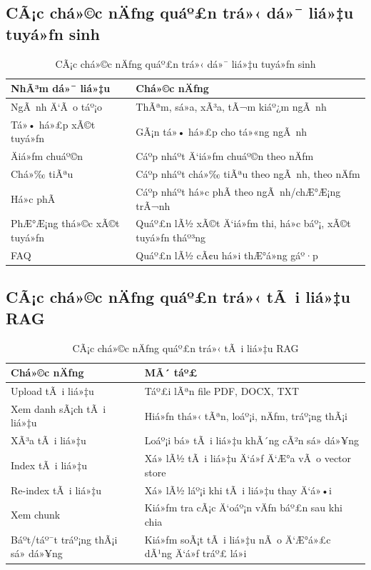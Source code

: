 ﻿\documentclass[12pt,a4paper]{report}
\begin{document}
\subsection{CÃ¡c chá»©c nÄƒng quáº£n trá»‹ dá»¯ liá»‡u tuyá»ƒn sinh}
\begin{table}[H]
\centering
\caption{CÃ¡c chá»©c nÄƒng quáº£n trá»‹ dá»¯ liá»‡u tuyá»ƒn sinh}
\label{tab:admin_data_functions}
\begin{tabular}{|p{4cm}|p{8cm}|}
\hline
\textbf{NhÃ³m dá»¯ liá»‡u} & \textbf{Chá»©c nÄƒng} \\ \hline
NgÃ nh Ä‘Ã o táº¡o & ThÃªm, sá»­a, xÃ³a, tÃ¬m kiáº¿m ngÃ nh \\ \hline
Tá»• há»£p xÃ©t tuyá»ƒn & GÃ¡n tá»• há»£p cho tá»«ng ngÃ nh \\ \hline
Äiá»ƒm chuáº©n & Cáº­p nháº­t Ä‘iá»ƒm chuáº©n theo nÄƒm \\ \hline
Chá»‰ tiÃªu & Cáº­p nháº­t chá»‰ tiÃªu theo ngÃ nh, theo nÄƒm \\ \hline
Há»c phÃ­ & Cáº­p nháº­t há»c phÃ­ theo ngÃ nh/chÆ°Æ¡ng trÃ¬nh \\ \hline
PhÆ°Æ¡ng thá»©c xÃ©t tuyá»ƒn & Quáº£n lÃ½ xÃ©t Ä‘iá»ƒm thi, há»c báº¡, xÃ©t tuyá»ƒn tháº³ng \\ \hline
FAQ & Quáº£n lÃ½ cÃ¢u há»i thÆ°á»ng gáº·p \\ \hline
\end{tabular}
\end{table}

\subsection{CÃ¡c chá»©c nÄƒng quáº£n trá»‹ tÃ i liá»‡u RAG}
\begin{table}[H]
\centering
\caption{CÃ¡c chá»©c nÄƒng quáº£n trá»‹ tÃ i liá»‡u RAG}
\label{tab:admin_rag_functions}
\begin{tabular}{|p{4cm}|p{8cm}|}
\hline
\textbf{Chá»©c nÄƒng} & \textbf{MÃ´ táº£} \\ \hline
Upload tÃ i liá»‡u & Táº£i lÃªn file PDF, DOCX, TXT \\ \hline
Xem danh sÃ¡ch tÃ i liá»‡u & Hiá»ƒn thá»‹ tÃªn, loáº¡i, nÄƒm, tráº¡ng thÃ¡i \\ \hline
XÃ³a tÃ i liá»‡u & Loáº¡i bá» tÃ i liá»‡u khÃ´ng cÃ²n sá»­ dá»¥ng \\ \hline
Index tÃ i liá»‡u & Xá»­ lÃ½ tÃ i liá»‡u Ä‘á»ƒ Ä‘Æ°a vÃ o vector store \\ \hline
Re-index tÃ i liá»‡u & Xá»­ lÃ½ láº¡i khi tÃ i liá»‡u thay Ä‘á»•i \\ \hline
Xem chunk & Kiá»ƒm tra cÃ¡c Ä‘oáº¡n vÄƒn báº£n sau khi chia \\ \hline
Báº­t/táº¯t tráº¡ng thÃ¡i sá»­ dá»¥ng & Kiá»ƒm soÃ¡t tÃ i liá»‡u nÃ o Ä‘Æ°á»£c dÃ¹ng Ä‘á»ƒ tráº£ lá»i \\ \hline
\end{tabular}
\end{table}
\end{document}
